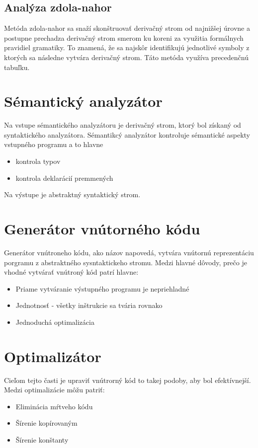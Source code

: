 \subsection{Analýza zdola-nahor}
Metóda zdola-nahor sa snaží skonštruovať derivačný strom od najnižšej úrovne a postupne prechadza derivačný strom smerom ku koreni za využitia formálnych pravidiel gramatiky. To znamená, že sa najskôr identifikujú jednotlivé symboly z ktorých sa následne vytvára derivačný strom. Táto metóda využíva precedenčnú tabuľku. \cite{aho}

\section{Sémantický analyzátor}
Na vstupe sémantického analyzátoru je derivačný strom, ktorý bol získaný od
syntaktického analyzátora. Sémantikcý analyzátor kontroluje sémantické aspekty
vstupného programu a to hlavne 
\begin{itemize}
    \item kontrola typov
    \item kontrola deklarácií premmených
\end{itemize}
Na výstupe je abstraktný syntaktický strom.

\section{Generátor vnútorného kódu}
Generátor vnútroneho kódu, ako názov napovedá, vytvára vnútornú reprezentáciu porgramu
z abstraktného sysntaktickeho stromu. Medzi hlavné dôvody, prečo je vhodné
vytvárať vnútroný kód patrí hlavne:
\begin{itemize}
    \item Priame vytváranie výstupného programu je nepriehladné
    \item Jednotnosť - všetky inštrukcie sa tvária rovnako
    \item Jednoduchá optimalizácia
\end{itemize}

\section{Optimalizátor}
Cieľom tejto časti je upraviť vnútrorný kód to takej podoby, aby bol efektívnejší.
Medzi optimalizácie môžu patriť:
\begin{itemize}
    \item Eliminácia mŕtveho kódu
    \item Šírenie kopírovaným
    \item Šírenie konštanty
\end{itemize}

